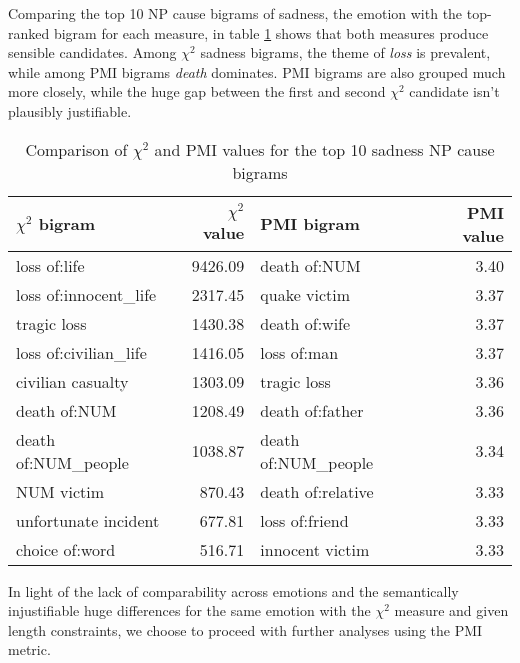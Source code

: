 Comparing the top 10 NP cause bigrams of sadness, the emotion with the top-ranked bigram for each measure, in table \ref{tab:chi-pmi sadness} shows that both measures produce sensible candidates. Among $\chi^{2}$ sadness bigrams, the theme of \textit{loss} is prevalent, while among PMI bigrams \textit{death} dominates. PMI bigrams are also grouped much more closely, while the huge gap between the first and second $\chi^{2}$ candidate isn't plausibly justifiable.

\begin{table}[h]
\centering
\begin{tabular}{l|r|l|r}
{\bf $\chi^{2}$ bigram} & {\bf $\chi^{2}$ value} & {\bf PMI bigram}        & {\bf PMI value} \\\hline
loss of:life            & 9426.09                & death of:NUM         & 3.40            \\
loss of:innocent\_life  & 2317.45                & quake victim            & 3.37            \\
tragic loss             & 1430.38                & death of:wife           & 3.37            \\
loss of:civilian\_life  & 1416.05                & loss of:man             & 3.37            \\
civilian casualty       & 1303.09                & tragic loss             & 3.36            \\
death of:NUM            & 1208.49                & death of:father         & 3.36            \\
death of:NUM\_people & 1038.87                & death of:NUM\_people & 3.34            \\
NUM victim           & 870.43                 & death of:relative       & 3.33            \\
unfortunate incident    & 677.81                 & loss of:friend          & 3.33            \\
choice of:word          & 516.71                 & innocent victim         & 3.33           
\end{tabular}
\caption{Comparison of $\chi^{2}$ and PMI values for the top 10 sadness NP cause bigrams}
\label{tab:chi-pmi sadness}
\end{table}

In light of the lack of comparability across emotions and the semantically injustifiable huge differences for the same emotion with the $\chi^{2}$ measure and given length constraints, we choose to proceed with further analyses using the PMI metric.

